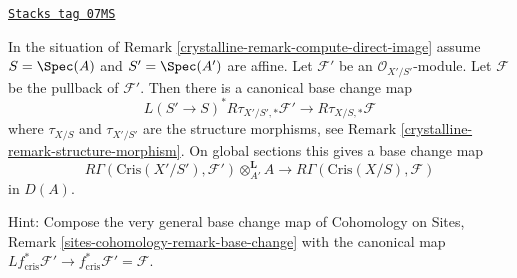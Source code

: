 \begin{remark}

\label{crystalline-remark-base-change}
\href{https://stacks.math.columbia.edu/tag/07MS}{\texttt{Stacks tag 07MS}}

In the situation of Remark \ref{crystalline-remark-compute-direct-image}
assume $S = \Spec(A)$ and $S' = \Spec(A')$ are affine.
Let $\mathcal{F}'$ be an $\mathcal{O}_{X'/S'}$-module.
Let $\mathcal{F}$ be the pullback of $\mathcal{F}'$.
Then there is a canonical base change map
$$
L(S' \to S)^*R\tau_{X'/S', *}\mathcal{F}'
\longrightarrow
R\tau_{X/S, *}\mathcal{F}
$$
where $\tau_{X/S}$ and $\tau_{X'/S'}$ are the structure morphisms, see
Remark \ref{crystalline-remark-structure-morphism}. On global sections this
gives a base change map
\begin{equation}
\label{equation-base-change-map}
R\Gamma(\text{Cris}(X'/S'), \mathcal{F}') \otimes^\mathbf{L}_{A'} A
\longrightarrow
R\Gamma(\text{Cris}(X/S), \mathcal{F})
\end{equation}
in $D(A)$.

\medskip\noindent
Hint: Compose the very general base change map of
Cohomology on Sites, Remark \ref{sites-cohomology-remark-base-change}
with the canonical map
$Lf_{\text{cris}}^*\mathcal{F}' \to
f_{\text{cris}}^*\mathcal{F}' = \mathcal{F}$.
\end{remark}

